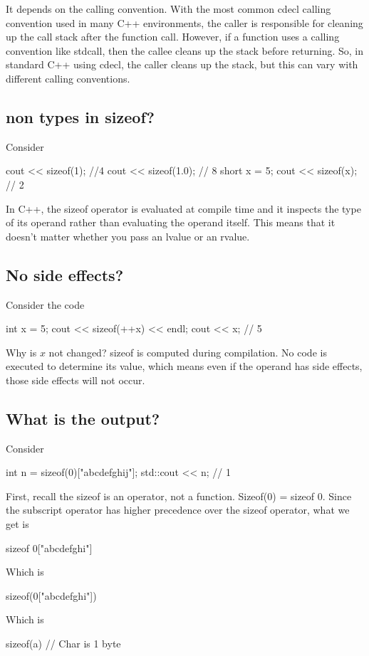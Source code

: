 \documentclass{report}
\begin{document}
\pagebreak 
{}
\bigbreak \noindent 
It depends on the calling convention. With the most common cdecl calling convention used in many C++ environments, the caller is responsible for cleaning up the call stack after the function call. However, if a function uses a calling convention like stdcall, then the callee cleans up the stack before returning.
\bigbreak \noindent 
So, in standard C++ using cdecl, the caller cleans up the stack, but this can vary with different calling conventions.


\pagebreak 
{}
\bigbreak \noindent 
\subsection{non types in sizeof?}
\bigbreak \noindent 
Consider
\bigbreak \noindent 
\begin{cppcode}
cout << sizeof(1); //4
cout << sizeof(1.0); // 8
short x = 5;
cout << sizeof(x); // 2
\end{cppcode}
\bigbreak \noindent 
In C++, the sizeof operator is evaluated at compile time and it inspects the type of its operand rather than evaluating the operand itself. This means that it doesn’t matter whether you pass an lvalue or an rvalue.

\bigbreak \noindent 
\subsection{No side effects?}
\bigbreak \noindent 
Consider the code
\bigbreak \noindent 
\begin{cppcode}
    int x = 5;
    cout << sizeof(++x) << endl;
    cout << x; // 5
\end{cppcode}
\bigbreak \noindent 
Why is $x$ not changed?  sizeof is computed during compilation. No code is executed to determine its value, which means even if the operand has side effects, those side effects will not occur.

\bigbreak \noindent 
\subsection{What is the output?}
\bigbreak \noindent 
Consider
\bigbreak \noindent 
\begin{cppcode}
    int n = sizeof(0)["abcdefghij"];
    std::cout << n; // 1
\end{cppcode}
\bigbreak \noindent 
First, recall the sizeof is an operator, not a function. Sizeof(0) = sizeof  0. Since the subscript operator has higher precedence over the sizeof operator, what we get is
\bigbreak \noindent 
\begin{cppcode}
    sizeof 0["abcdefghi"]
\end{cppcode}
\bigbreak \noindent 
Which is
\bigbreak \noindent 
\begin{cppcode}
    sizeof(0["abcdefghi"])
\end{cppcode}
\bigbreak \noindent 
Which is
\bigbreak \noindent 
\begin{cppcode}
sizeof(a) // Char is 1 byte
\end{cppcode}
\end{document}
